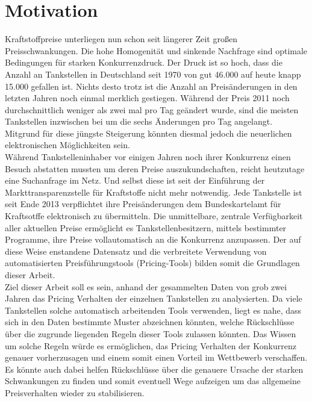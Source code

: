 \documentclass[12pt,a4paper,bibliography=totocnumbered,listof=totocnumbered]{scrartcl}
\begin{document}
\setcounter{page}{1}
\onehalfspacing
{}
\section{Motivation}
Kraftstoffpreise unterliegen nun schon seit längerer Zeit großen Preisschwankungen. Die hohe Homogenität und sinkende Nachfrage sind optimale Bedingungen für starken Konkurrenzdruck. Der Druck ist so hoch, dass die Anzahl an Tankstellen in Deutschland seit 1970 von gut 46.000 auf heute knapp 15.000 gefallen ist.\cite{PraTa} Nichts desto trotz ist die Anzahl an Preisänderungen in den letzten Jahren noch einmal merklich gestiegen. Während der Preis 2011 noch durchschnittlich weniger als zwei mal pro Tag geändert wurde, sind die meisten Tankstellen inzwischen bei um die sechs Änderungen pro Tag angelangt.\cite{Unity} Mitgrund für diese jüngste Steigerung könnten diesmal jedoch die neuerlichen elektronischen Möglichkeiten sein.\\

Während Tankstelleninhaber vor einigen Jahren noch ihrer Konkurrenz einen Besuch abstatten mussten um deren Preise auszukundschaften, reicht heutzutage eine Suchanfrage im Netz. Und selbst diese ist seit der Einführung der Markttransparenzstelle für Kraftstoffe nicht mehr notwendig. Jede Tankstelle ist seit Ende 2013 verpflichtet ihre Preisänderungen dem Bundeskartelamt für Kraftsotffe elektronisch zu übermitteln. Die unmittelbare, zentrale Verfügbarkeit aller aktuellen Preise ermöglicht es Tankstellenbesitzern, mittels bestimmter Programme, ihre Preise vollautomatisch an die Konkurrenz anzupassen. Der auf diese Weise enstandene Datensatz und die verbreitete Verwendung von automatisierten Preisführungstools (Pricing-Tools) bilden somit die Grundlagen dieser Arbeit.\\

Ziel dieser Arbeit soll es sein, anhand der gesammelten Daten von grob zwei Jahren das Pricing Verhalten der einzelnen Tankstellen zu analysierten. Da  viele Tankstellen solche automatisch arbeitenden Tools verwenden, liegt es nahe, dass sich in den Daten bestimmte Muster abzeichnen könnten, welche Rückschlüsse über die zugrunde liegenden Regeln dieser Tools zulassen könnten. Das Wissen um solche Regeln würde es ermöglichen, das Pricing Verhalten der Konkurrenz genauer vorherzusagen und einem somit einen Vorteil im Wettbewerb verschaffen. Es könnte auch dabei helfen Rückschlüsse über die genauere Ursache der starken Schwankungen zu finden und somit eventuell Wege  aufzeigen um das allgemeine Preisverhalten wieder zu stabilisieren. 
\newpage
\vspace{-1,2em}
\end{document}

